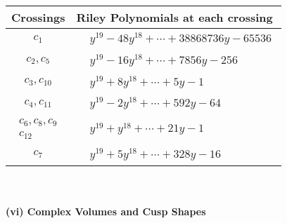 \documentclass[1p]{elsarticle_modified}
\theoremstyle{definition}
\begin{document}
\begin{tabular}{m{50pt}|m{274pt}}
Crossings & \hspace{64pt}Riley Polynomials at each crossing \\
\hline $$\begin{aligned}c_{1}\end{aligned}$$&$\begin{aligned}
&y^{19}-48 y^{18}+\cdots+38868736 y-65536
\end{aligned}$\\
\hline $$\begin{aligned}c_{2},c_{5}\end{aligned}$$&$\begin{aligned}
&y^{19}-16 y^{18}+\cdots+7856 y-256
\end{aligned}$\\
\hline $$\begin{aligned}c_{3},c_{10}\end{aligned}$$&$\begin{aligned}
&y^{19}+8 y^{18}+\cdots+5 y-1
\end{aligned}$\\
\hline $$\begin{aligned}c_{4},c_{11}\end{aligned}$$&$\begin{aligned}
&y^{19}-2 y^{18}+\cdots+592 y-64
\end{aligned}$\\
\hline $$\begin{aligned}c_{6},c_{8},c_{9}\\c_{12}\end{aligned}$$&$\begin{aligned}
&y^{19}+y^{18}+\cdots+21 y-1
\end{aligned}$\\
\hline $$\begin{aligned}c_{7}\end{aligned}$$&$\begin{aligned}
&y^{19}+5 y^{18}+\cdots+328 y-16
\end{aligned}$\\
\hline
\end{tabular}\\~\\
\newpage\flushleft \textbf{(vi) Complex Volumes and Cusp Shapes}
\end{document}
